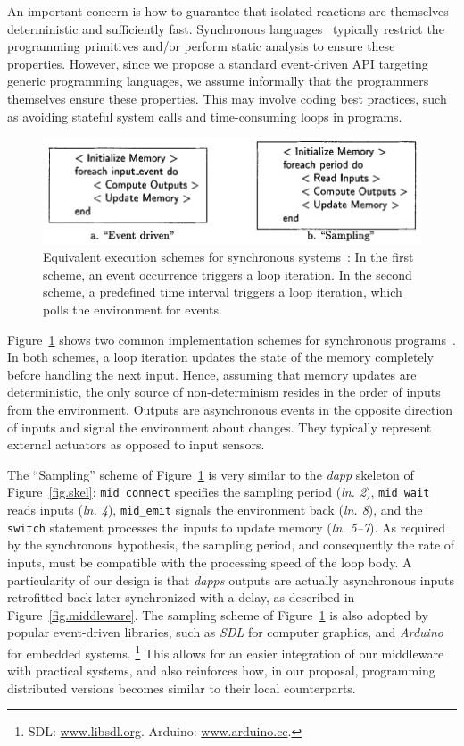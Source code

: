 \documentclass[sigplan,screen]{acmart}
\newcommand{\lin}[1]{(\emph{ln. #1}\xspace)}
\newcommand{\dapp}{\emph{dapp}\xspace}
\newcommand{\dapps}{\emph{dapps}\xspace}
\begin{document}
An important concern is how to guarantee that isolated reactions are themselves
deterministic and sufficiently fast.
Synchronous languages~\cite{langs} typically restrict the programming
primitives and/or perform static analysis to ensure these properties.
However, since we propose a standard event-driven API targeting generic
programming languages, we assume informally that the programmers themselves
ensure these properties.
This may involve coding best practices, such as avoiding stateful system calls
and time-consuming loops in programs.

\begin{figure}[t]
  \centering
  \includegraphics[width=\linewidth]{schemes}
  \caption{
    \label{fig.schemes}
    Equivalent execution schemes for synchronous systems~\cite{schemes}:
    In the first scheme, an event occurrence triggers a loop iteration.
    In the second scheme, a predefined time interval triggers a loop iteration,
    which polls the environment for events.
  }
\end{figure}

Figure~\ref{fig.schemes} shows two common implementation schemes for
synchronous programs~\cite{schemes}.
In both schemes, a loop iteration updates the state of the memory completely
before handling the next input.
Hence, assuming that memory updates are deterministic, the only source of
non-determinism resides in the order of inputs from the environment.
Outputs are asynchronous events in the opposite direction of inputs and
signal the environment about changes.
They typically represent external actuators as opposed to input sensors.

The ``Sampling'' scheme of Figure~\ref{fig.schemes} is very similar to the
\dapp skeleton of Figure~\ref{fig.skel}:
    \texttt{mid\_connect} specifies the sampling period \lin{2},
    \texttt{mid\_wait} reads inputs \lin{4},
    \texttt{mid\_emit} signals the environment back \lin{8}, and
    the \texttt{switch} statement processes the inputs to update memory \lin{5--7}.
As required by the synchronous hypothesis, the sampling period, and
consequently the rate of inputs, must be compatible with the processing speed
of the loop body.
A particularity of our design is that \dapps outputs are actually asynchronous
inputs retrofitted back later synchronized with a delay, as described in
Figure~\ref{fig.middleware}.
%
The sampling scheme of Figure~\ref{fig.schemes} is also adopted by popular
event-driven libraries, such as \emph{SDL} for computer graphics, and
\emph{Arduino} for embedded systems.%
\footnote{SDL: \url{www.libsdl.org}. Arduino: \url{www.arduino.cc}.}
This allows for an easier integration of our middleware with practical systems,
and also reinforces how, in our proposal, programming distributed versions
becomes similar to their local counterparts.
\end{document}
